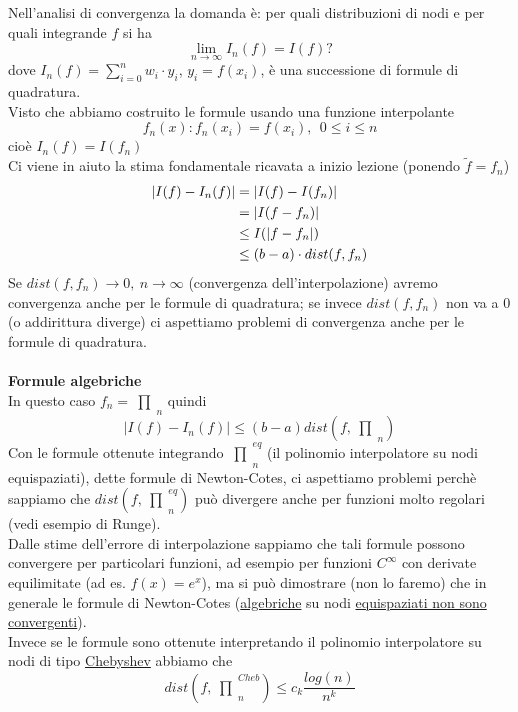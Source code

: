 \documentclass[12pt,a4paper]{article}
\DeclarePairedDelimiter{\abs}{\lvert}{\rvert}
\newcommand{\inter}{\begin{matrix}\prod\end{matrix}}
\begin{document}
Nell'analisi di convergenza la domanda è: per quali distribuzioni di nodi e per quali integrande $f$ si ha
\[
\lim_{n \to \infty} I_n (f) = I(f) ?
\]
dove $I_n(f) = \sum_{i=0}^n w_i \cdot y_i$, $y_i = f(x_i)$, è una successione di formule di quadratura.\\
Visto che abbiamo costruito le formule usando una funzione interpolante
\[
f_n(x): f_n(x_i) = f(x_i), \ \ 0 \le i \le n
\]
cioè $I_n(f) = I(f_n)$\\
Ci viene in aiuto la stima fondamentale ricavata a inizio lezione (ponendo $\tilde{f} = f_n$)
\[
\begin{split}
\abs{I(f) - I_n(f)} & = \abs{I(f) - I(f_n)} \\
& = \abs{I(f - f_n)} \\
& \le I(\abs{f - f_n}) \\
& \le (b-a) \cdot dist(f, f_n)
\end{split}
\]
Se $dist(f, f_n) \to 0, \ n \to \infty$ (convergenza dell'interpolazione) avremo convergenza anche per le formule di quadratura; se invece $dist(f, f_n)$ non va a 0 (o addirittura diverge) ci aspettiamo problemi
di convergenza anche per le formule di quadratura.\\\\
\textbf{Formule algebriche}\\
In questo caso $f_n=\inter_n$ quindi 
\begin{equation*}
    |I(f)-I_n(f)|\leq(b-a)dist(f,\inter_n)
\end{equation*}
Con le formule ottenute integrando $\inter_n^{eq}$ (il polinomio interpolatore su nodi equispaziati), dette formule di Newton-Cotes, ci aspettiamo problemi perchè sappiamo che $dist(f,\inter_n^{eq})$ può divergere anche per funzioni molto regolari (vedi esempio di Runge).\\
Dalle stime dell'errore di interpolazione sappiamo che tali formule possono convergere per particolari funzioni, ad esempio per funzioni $C^{\infty}$ con derivate equilimitate (ad es. $f(x)=e^x$), ma si può dimostrare (non lo faremo) che in generale le formule di Newton-Cotes (\underline{algebriche} su nodi \underline{equispaziati non sono convergenti}).\\ Invece se le formule sono ottenute interpretando il polinomio interpolatore su nodi di tipo \underline{Chebyshev} abbiamo che \\
\begin{equation*}
    dist(f,\inter_n^{Cheb})\leq c_k\frac{log(n)}{n^k}
\end{equation*}
\end{document}
